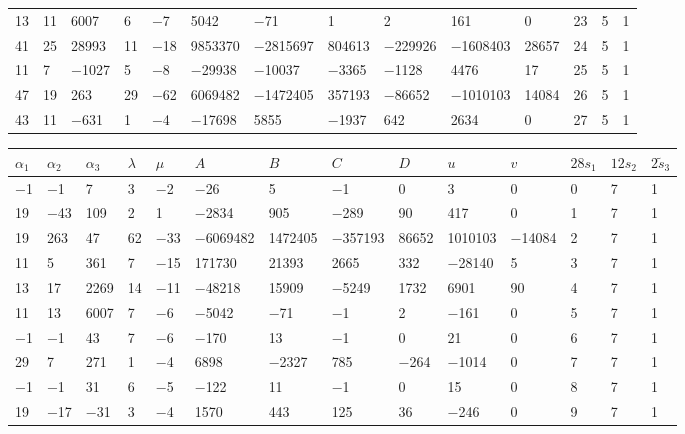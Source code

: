 \documentclass[pdftex]{sigma}
\numberwithin{equation}{section}
\theoremstyle{definition}
\numberwithin{table}{section}
\begin{document}
{\begin{paracol}{3}
\begin{supertabular}{|w{c}{.32cm}w{c}{.32cm}w{c}{.32cm}@{\hspace{.5cm}}w{c}{.2cm}w{c}{.2cm}|@{\hspace{\tabcolsep}}HHHHHHw{c}{.17cm}w{c}{.17cm}w{c}{.17cm}|}
			13 & 11 & 6007 & 6 & $-$7 & 5042 & $-$71 & 1 & 2 & 161 & 0 & 23 & 5 & 1 \\
			41 & 25 & 28993 & 11 & $-$18 & 9853370 & $-$2815697 & 804613 & $-$229926 & $-$1608403 & 28657 & 24 & 5 & 1 \\
			11 & 7 & $-$1027 & 5 & $-$8 & $-$29938 & $-$10037 & $-$3365 & $-$1128 & 4476 & 17 & 25 & 5 & 1 \\
			47 & 19 & 263 & 29 & $-$62 & 6069482 & $-$1472405 & 357193 & $-$86652 & $-$1010103 & 14084 & 26 & 5 & 1 \\
			43 & 11 & $-$631 & 1 & $-$4 & $-$17698 & 5855 & $-$1937 & 642 & 2634 & 0 & 27 & 5 & 1 \\ \hline
		\end{supertabular}
		
		\switchcolumn
		
		\begin{supertabular}{|w{c}{.32cm}w{c}{.32cm}w{c}{.32cm}@{\hspace{.5cm}}w{c}{.2cm}w{c}{.2cm}|@{\hspace{\tabcolsep}}HHHHHHw{c}{.17cm}w{c}{.17cm}w{c}{.17cm}|}
			\hline $\alpha_1$ & $\alpha_2$ & $\alpha_3$ & $\lambda$ & $\mu$ & $A$ & $B$ & $C$ & $D$ & $u$ & $v$ & $28s_1$ & $12s_2$ & $2\tilde{s}_3$ \\ \hline
			$-$1 & $-$1 & 7 & 3 & $-$2 & $-$26 & 5 & $-$1 & 0 & 3 & 0 & 0 & 7 & 1 \\
			19 & $-$43 & 109 & 2 & 1 & $-$2834 & 905 & $-$289 & 90 & 417 & 0 & 1 & 7 & 1 \\
			19 & 263 & 47 & 62 & $-$33 & $-$6069482 & 1472405 & $-$357193 & 86652 & 1010103 & $-$14084 & 2 & 7 & 1 \\
			11 & 5 & 361 & 7 & $-$15 & 171730 & 21393 & 2665 & 332 & $-$28140 & 5 & 3 & 7 & 1 \\
			13 & 17 & 2269 & 14 & $-$11 & $-$48218 & 15909 & $-$5249 & 1732 & 6901 & 90 & 4 & 7 & 1 \\
			11 & 13 & 6007 & 7 & $-$6 & $-$5042 & $-$71 & $-$1 & 2 & $-$161 & 0 & 5 & 7 & 1 \\
			$-$1 & $-$1 & 43 & 7 & $-$6 & $-$170 & 13 & $-$1 & 0 & 21 & 0 & 6 & 7 & 1 \\
			29 & 7 & 271 & 1 & $-$4 & 6898 & $-$2327 & 785 & $-$264 & $-$1014 & 0 & 7 & 7 & 1 \\
			$-$1 & $-$1 & 31 & 6 & $-$5 & $-$122 & 11 & $-$1 & 0 & 15 & 0 & 8 & 7 & 1 \\
			19 & $-$17 & $-$31 & 3 & $-$4 & 1570 & 443 & 125 & 36 & $-$246 & 0 & 9 & 7 & 1 \\

\end{supertabular}
\end{paracol}}
\end{document}
